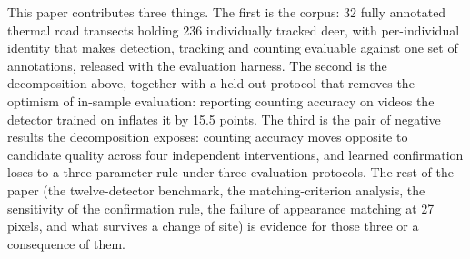 This paper contributes three things. The first is the corpus: 32 fully annotated thermal
road transects holding 236 individually tracked deer, with per-individual identity that makes
detection, tracking and counting evaluable against one set of annotations, released with the
evaluation harness. The second is the decomposition above, together with a held-out protocol
that removes the optimism of in-sample evaluation: reporting counting accuracy on videos the detector trained on inflates it by 15.5 points. The third is the pair of negative results
the decomposition exposes: counting accuracy moves opposite to candidate quality across four
independent interventions, and learned confirmation loses to a three-parameter rule under
three evaluation protocols. The rest of the paper (the twelve-detector benchmark, the matching-criterion analysis, the sensitivity of the confirmation rule, the failure of appearance matching at 27 pixels, and what survives a change of site) is evidence
for those three or a consequence of them.
